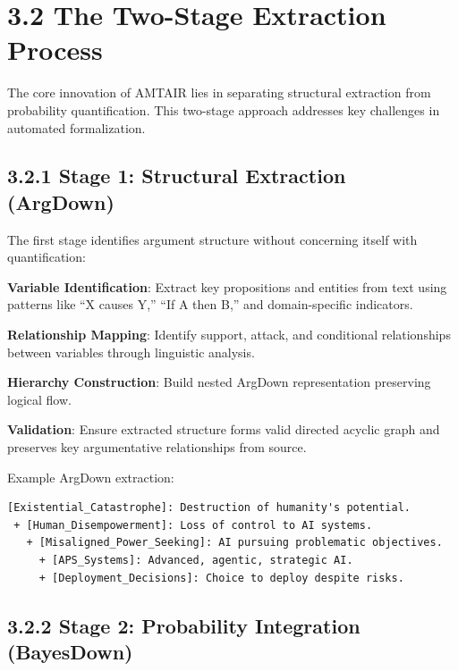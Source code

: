 \documentclass[
  11pt,
  letterpaper,
]{book}
\begin{document}
\section*{3.2 The Two-Stage Extraction
Process}\label{sec-two-stage-extraction}


The core innovation of AMTAIR lies in separating structural extraction
from probability quantification. This two-stage approach addresses key
challenges in automated formalization.

\subsection*{3.2.1 Stage 1: Structural Extraction
(ArgDown)}\label{sec-stage1-argdown}

The first stage identifies argument structure without concerning itself
with quantification:

\textbf{Variable Identification}: Extract key propositions and entities
from text using patterns like ``X causes Y,'' ``If A then B,'' and
domain-specific indicators.

\textbf{Relationship Mapping}: Identify support, attack, and conditional
relationships between variables through linguistic analysis.

\textbf{Hierarchy Construction}: Build nested ArgDown representation
preserving logical flow.

\textbf{Validation}: Ensure extracted structure forms valid directed
acyclic graph and preserves key argumentative relationships from source.

Example ArgDown extraction:

\begin{verbatim}
[Existential_Catastrophe]: Destruction of humanity's potential.
 + [Human_Disempowerment]: Loss of control to AI systems.
   + [Misaligned_Power_Seeking]: AI pursuing problematic objectives.
     + [APS_Systems]: Advanced, agentic, strategic AI.
     + [Deployment_Decisions]: Choice to deploy despite risks.
\end{verbatim}

\subsection*{3.2.2 Stage 2: Probability Integration
(BayesDown)}\label{sec-stage2-bayesdown}
\end{document}

